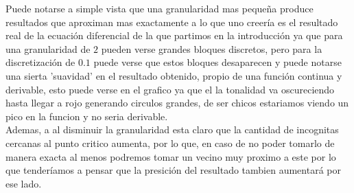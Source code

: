 Puede notarse a simple vista que una granularidad mas pequeña produce resultados que aproximan mas exactamente a lo que uno creería es el resultado real de la ecuación diferencial de la que partimos en la introducción ya que para una granularidad de $2$ pueden verse grandes bloques discretos, pero para la discretización de $0.1$ puede verse que estos bloques desaparecen y puede notarse una sierta 'suavidad' en el resultado obtenido, propio de una función continua y derivable, esto puede verse en el grafico ya que el la tonalidad va oscureciendo hasta llegar a rojo generando circulos grandes, de ser chicos estariamos viendo un pico en la funcion y no seria derivable.
\\
Ademas, a al disminuir la granularidad esta claro que la cantidad de incognitas cercanas al punto critico aumenta, por lo que, en caso de no poder tomarlo de manera exacta al menos podremos tomar un vecino muy proximo a este por lo que tenderíamos a pensar que la presición del resultado tambien aumentará por ese lado.
